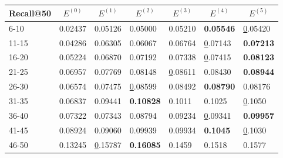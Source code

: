 \begin{table*}[]
    \begin{tabular}{|l|l|l|l|l|l|l|}
    \hline
    Recall@50 & \multicolumn{1}{c|}{$E^{(0)}$} & \multicolumn{1}{c|}{$E^{(1)}$} & \multicolumn{1}{c|}{$E^{(2)}$} & \multicolumn{1}{c|}{$E^{(3)}$} & \multicolumn{1}{c|}{$E^{(4)}$} & \multicolumn{1}{c|}{$E^{(5)}$} \\ \hline
    6-10      & 0.02437                        & 0.05126                        & 0.05000                        & 0.05210                        & \textbf{0.05546}               & {\ul 0.05420}                  \\ \hline
    11-15     & 0.04286                        & 0.06305                        & 0.06067                        & 0.06764                        & {\ul 0.07143}                  & \textbf{0.07213}               \\ \hline
    16-20     & 0.05224                        & 0.06870                        & 0.07192                        & 0.07338                        & {\ul 0.07415}                  & \textbf{0.08123}               \\ \hline
    21-25     & 0.06957                        & 0.07769                        & 0.08148                        & {\ul 0.08611}                  & 0.08430                        & \textbf{0.08944}               \\ \hline
    26-30     & 0.06574                        & 0.07475                        & {\ul 0.08599}                  & 0.08492                        & \textbf{0.08790}               & 0.08176                        \\ \hline
    31-35     & 0.06837                        & 0.09441                        & \textbf{0.10828}               & 0.1011                         & 0.1025                         & {\ul 0.1050}                   \\ \hline
    36-40     & 0.07322                        & 0.07343                        & 0.08794                        & 0.09234                        & {\ul 0.09341}                  & \textbf{0.09957}               \\ \hline
    41-45     & 0.08924                        & 0.09060                        & 0.09939                        & 0.09934                        & \textbf{0.1045}                & {\ul 0.1030}                   \\ \hline
    46-50     & 0.13245                        & {\ul 0.15787}                  & \textbf{0.16085}               & 0.1459                         & 0.1518                         & 0.1577                         \\ \hline

\end{tabular}
\end{table*}
